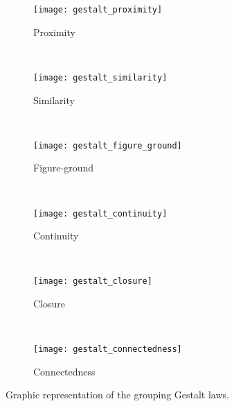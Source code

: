 \begin{figure}[!ht]
    \centering
    \begin{subfigure}[b]{0.25\textwidth}
        \texttt{[image: gestalt\_proximity]}
        \caption{Proximity}
        \label{fig:gestalt_proximity}
    \end{subfigure}
        ~ %
    \begin{subfigure}[b]{0.25\textwidth}
        \texttt{[image: gestalt\_similarity]}
        \caption{Similarity}
        \label{fig:gestalt_similarity}
    \end{subfigure}
        ~ %
    \begin{subfigure}[b]{0.25\textwidth}
        \texttt{[image: gestalt\_figure\_ground]}
        \caption{Figure-ground}
        \label{fig:gestalt_figure_ground}
    \end{subfigure} \\
    \begin{subfigure}[b]{0.25\textwidth}
        \texttt{[image: gestalt\_continuity]}
        \caption{Continuity}
        \label{fig:gestalt_continuity}
    \end{subfigure}
        ~ %
    \begin{subfigure}[b]{0.25\textwidth}
        \texttt{[image: gestalt\_closure]}
        \caption{Closure}
        \label{fig:gestalt_closure}
    \end{subfigure}
        ~ %
    \begin{subfigure}[b]{0.25\textwidth}
        \texttt{[image: gestalt\_connectedness]}
        \caption{Connectedness}
        \label{fig:gestalt_connectedness}
    \end{subfigure}
    
    \caption{Graphic representation of the grouping Gestalt laws.}\label{fig:gestalt_laws}
\end{figure}

